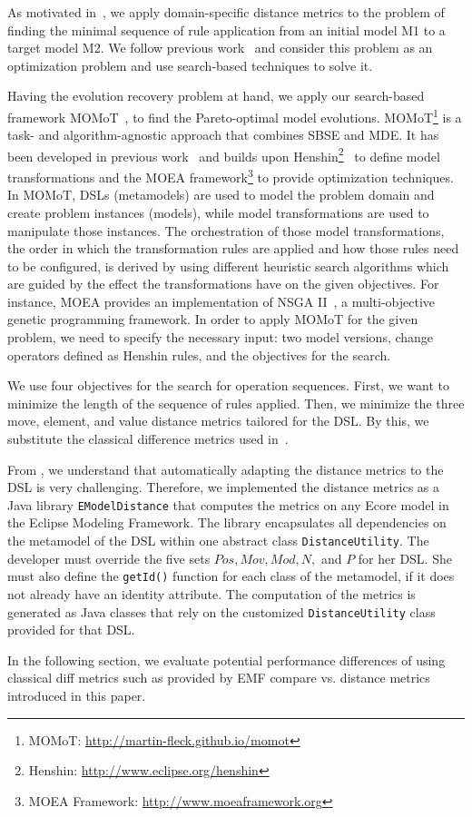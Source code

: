 
As motivated in~, we apply domain-specific distance metrics to the problem of finding the minimal sequence of rule application from an initial model M1 to a target model M2. We follow previous work~\cite{KessentiniMWOD17,FadhelKLW12} and consider this problem as an optimization problem and use search-based techniques to solve it.

Having the evolution recovery problem at hand, we apply our search-based framework MOMoT~\cite{Fleck15,FleckTW16}, to find the Pareto-optimal model evolutions.
MOMoT\footnote{
    MOMoT: \url{http://martin-fleck.github.io/momot}
} is a task- and algorithm-agnostic approach that combines SBSE and MDE.
It has been developed in previous work~\cite{Fleck15} and builds upon Henshin\footnote{
    Henshin: \url{http://www.eclipse.org/henshin}
}~\cite{Arendt10} to define model transformations and the MOEA framework\footnote{
    MOEA Framework: \url{http://www.moeaframework.org}
} to provide optimization techniques.
In MOMoT, DSLs (\ie metamodels) are used to model the problem domain and create problem instances (\ie models), while model transformations are used to manipulate those instances.
The orchestration of those model transformations, \ie the order in which the transformation rules are applied and how those rules need to be configured, is derived by using different heuristic search algorithms which are guided by the effect the transformations have on the given objectives.
For instance, MOEA provides an implementation of NSGA II~\cite{DebAPM02}, a multi-objective genetic programming framework.
In order to apply MOMoT for the given problem, we need to specify the necessary input: two model versions, change operators defined as Henshin rules, and the objectives for the search.

We use four objectives for the search for operation sequences.
First, we want to minimize the length of the sequence of rules applied.
Then, we minimize the three move, element, and value distance metrics tailored for the DSL. By this, we substitute the classical difference metrics used in~\cite{KessentiniMWOD17,FadhelKLW12}. 

From , we understand that automatically adapting the distance metrics to the DSL is very challenging.
Therefore, we implemented the distance metrics as a Java library \texttt{EModelDistance} that computes the metrics on any Ecore model in the Eclipse Modeling Framework.
The library encapsulates all dependencies on the metamodel of the DSL within one abstract class \texttt{DistanceUtility}.
The developer must override the five sets $Pos,Mov,Mod,N,$ and $P$ for her DSL.
She must also define the \texttt{getId()} function for each class of the metamodel, if it does not already have an identity attribute.
The computation of the metrics is generated as Java classes that rely on the customized \texttt{DistanceUtility} class provided for that DSL. 

In the following section, we evaluate potential performance differences of using classical diff metrics such as provided by EMF compare vs. distance metrics introduced in this paper. 